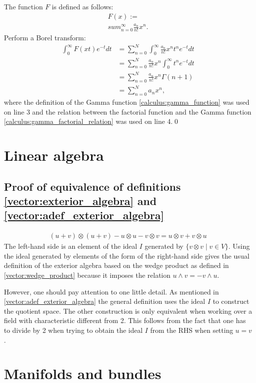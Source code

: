     The function $F$ is defined as follows:
    \begin{gather}
        F(x) := \\sum_{n=0}^\infty\frac{a_n}{n!}x^n.
    \end{gather}
    Perform a Borel transform:
    \begin{align*}
        \int_0^\infty F(xt)e^{-t}dt&=\sum_{n=0}^N\int_0^\infty\frac{a_n}{n!}x^nt^ne^{-t}dt\\
        &=\sum_{n=0}^N\frac{a_n}{n!}x^n\int_0^\infty t^ne^{-t}dt\\
        &=\sum_{n=0}^N\frac{a_n}{n!}x^n\Gamma(n+1)\\
        &=\sum_{n=0}^Na_nx^n,
   \end{align*}
   where the definition of the Gamma function \ref{calculus:gamma_function} was used on line 3 and the relation between the factorial function and the Gamma function \eqref{calculus:gamma_factorial_relation} was used on line 4.\qed

\section{Linear algebra}
\subsection{Proof of equivalence of definitions \ref{vector:exterior_algebra} and \ref{vector:adef_exterior_algebra}}

    \begin{gather}
        (u+v)\otimes(u+v) - u\otimes u - v\otimes v = u\otimes v + v\otimes u
    \end{gather}
    The left-hand side is an element of the ideal $I$ generated by $\{v\otimes v\mid v\in V\}$. Using the ideal generated by elements of the form of the right-hand side gives the usual definition of the exterior algebra based on the wedge product as defined in \ref{vector:wedge_product} because it imposes the relation $u\wedge v = -v\wedge u$.

    However, one should pay attention to one little detail. As mentioned in \ref{vector:adef_exterior_algebra} the general definition uses the ideal $I$ to construct the quotient space. The other construction is only equivalent when working over a field with characteristic different from 2. This follows from the fact that one has to divide by 2 when trying to obtain the ideal $I$ from the RHS when setting $u=v$.

\section{Manifolds and bundles}
